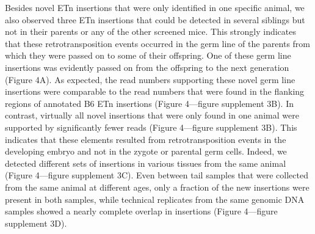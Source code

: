 \documentclass[11pt,a4paper]{article}
\begin{document}
Besides novel ETn insertions that were only identified in one specific animal, we also observed three ETn insertions that could be detected in several siblings but not in their parents or any of the other screened mice. This strongly indicates that these retrotransposition events occurred in the germ line of the parents from which they were passed on to some of their offspring. One of these germ line insertions was evidently passed on from the offspring to the next generation (Figure 4A). As expected, the read numbers supporting these novel germ line insertions were comparable to the read numbers that were found in the flanking regions of annotated B6 ETn insertions (Figure 4—figure supplement 3B). In contrast, virtually all novel insertions that were only found in one animal were supported by significantly fewer reads (Figure 4—figure supplement 3B). This indicates that these elements resulted from retrotransposition events in the developing embryo and not in the zygote or parental germ cells. Indeed, we detected different sets of insertions in various tissues from the same animal (Figure 4—figure supplement 3C). Even between tail samples that were collected from the same animal at different ages, only a fraction of the new insertions were present in both samples, while technical replicates from the same genomic DNA samples showed a nearly complete overlap in insertions (Figure 4—figure supplement 3D).
\end{document}

